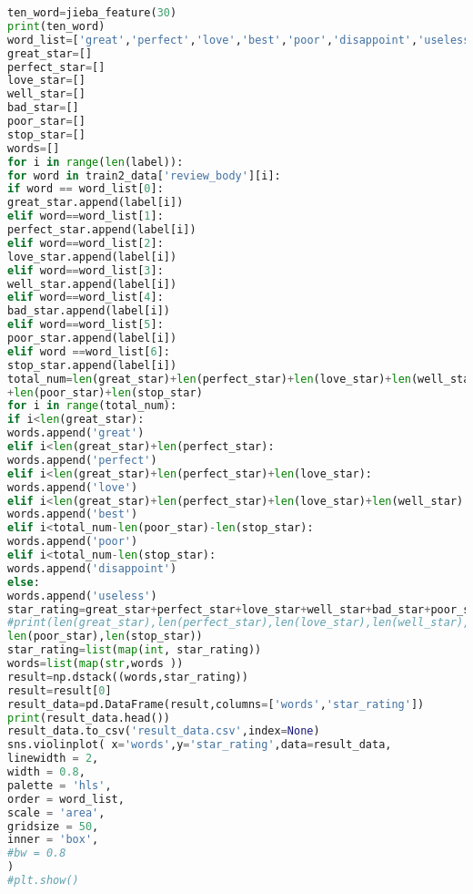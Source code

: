 \documentclass{mcmthesis}
\begin{document}
\begin{appendices}
\begin{lstlisting}[language=python]
ten_word=jieba_feature(30)
print(ten_word)
word_list=['great','perfect','love','best','poor','disappoint','useless']
great_star=[]
perfect_star=[]
love_star=[]
well_star=[]
bad_star=[]
poor_star=[]
stop_star=[]
words=[]
for i in range(len(label)):
for word in train2_data['review_body'][i]:
if word == word_list[0]:
great_star.append(label[i])
elif word==word_list[1]:
perfect_star.append(label[i])
elif word==word_list[2]:
love_star.append(label[i])
elif word==word_list[3]:
well_star.append(label[i])
elif word==word_list[4]:
bad_star.append(label[i])
elif word==word_list[5]:
poor_star.append(label[i])
elif word ==word_list[6]:
stop_star.append(label[i])
total_num=len(great_star)+len(perfect_star)+len(love_star)+len(well_star)+len(bad_star)
+len(poor_star)+len(stop_star)
for i in range(total_num):
if i<len(great_star):
words.append('great')
elif i<len(great_star)+len(perfect_star):
words.append('perfect')
elif i<len(great_star)+len(perfect_star)+len(love_star):
words.append('love')
elif i<len(great_star)+len(perfect_star)+len(love_star)+len(well_star):
words.append('best')
elif i<total_num-len(poor_star)-len(stop_star):
words.append('poor')
elif i<total_num-len(stop_star):
words.append('disappoint')
else:
words.append('useless')
star_rating=great_star+perfect_star+love_star+well_star+bad_star+poor_star+stop_star
#print(len(great_star),len(perfect_star),len(love_star),len(well_star),len(bad_star),
len(poor_star),len(stop_star))
star_rating=list(map(int, star_rating))
words=list(map(str,words ))
result=np.dstack((words,star_rating))
result=result[0]
result_data=pd.DataFrame(result,columns=['words','star_rating'])
print(result_data.head())
result_data.to_csv('result_data.csv',index=None)
sns.violinplot( x='words',y='star_rating',data=result_data,
linewidth = 2,   
width = 0.8,     
palette = 'hls', 
order = word_list, 
scale = 'area',  
gridsize = 50,   
inner = 'box',  
#bw = 0.8       
)
#plt.show()


\end{lstlisting}

\end{appendices}
\end{document}
